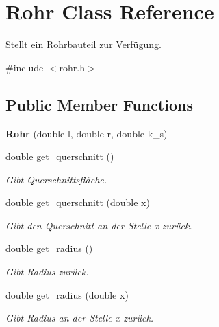 \hypertarget{class_rohr}{}\section{Rohr Class Reference}
\label{class_rohr}


Stellt ein Rohrbauteil zur Verfügung.  




{\ttfamily \#include $<$rohr.\+h$>$}

\subsection*{Public Member Functions}
\begin{DoxyCompactItemize}
\item 
\mbox{\label{class_rohr_afbfc5b0d4a796c1c88b89d88b7b36768}} 
{\bfseries Rohr} (double l, double r, double k\+\_\+s)
\item 
\mbox{\label{class_rohr_a6763a65cfe3992b6dd4baa903ae44b29}} 
double \hyperlink{class_rohr_a6763a65cfe3992b6dd4baa903ae44b29}{get\+\_\+querschnitt} ()
\begin{DoxyCompactList}\small\item\em Gibt Querschnittsfläche. \end{DoxyCompactList}\item 
double \hyperlink{class_rohr_ab8c1e474c5b1510a7c52cb805260ab15}{get\+\_\+querschnitt} (double x)
\begin{DoxyCompactList}\small\item\em Gibt den Querschnitt an der Stelle x zurück. \end{DoxyCompactList}\item 
\mbox{\label{class_rohr_a273b05707337661cfaab228a670350f2}} 
double \hyperlink{class_rohr_a273b05707337661cfaab228a670350f2}{get\+\_\+radius} ()
\begin{DoxyCompactList}\small\item\em Gibt Radius zurück. \end{DoxyCompactList}\item 
double \hyperlink{class_rohr_a427e4ad6d350912715bd6796e385eaf3}{get\+\_\+radius} (double x)
\begin{DoxyCompactList}\small\item\em Gibt Radius an der Stelle x zurück. \end{DoxyCompactList}\item 

\end{DoxyCompactItemize}

